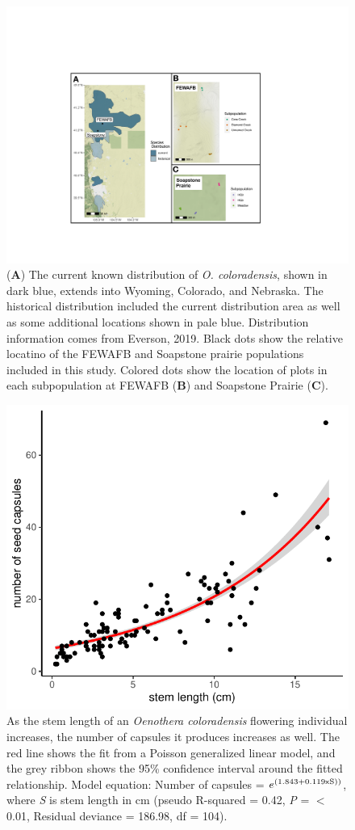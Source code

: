 \documentclass[12pt, letterpaper]{article}
\begin{document}
\begin{figure}[h!]
    \centering
    \includegraphics[width = 1\textwidth]{figures/COBP_mapFigure.pdf}
    \caption{\internallinenumbers(\textbf{A}) The current known distribution of \textit{O. coloradensis}, shown in dark blue, extends into Wyoming, Colorado, and Nebraska. The historical distribution included the current distribution area as well as some additional locations shown in pale blue. Distribution information comes from Everson, 2019. Black dots show the relative locatino of the FEWAFB and Soapstone prairie populations included in this study. Colored dots show the location of plots in each subpopulation at FEWAFB (\textbf{B}) and Soapstone Prairie (\textbf{C}).}
    \label{fig:plotMap}
\end{figure}

\begin{figure}[ht!]
  \centering
  \includegraphics[width=.7\textwidth]{seedRegressionPlot.pdf}
  \caption{ \internallinenumbers As the stem length of an \textit{Oenothera coloradensis} flowering individual increases, the number of capsules it produces increases as well. The red line shows the fit from a Poisson generalized linear model, and the grey ribbon shows the 95\% confidence interval around the fitted relationship. Model equation: Number of capsules = $e^{(1.843 + 0.119\text{\textsf{x}}\text{S}))}$, where \textit{S} is stem length in cm (pseudo R-squared = 0.42, \textit{P} = $<$ 0.01, Residual deviance = 186.98, df = 104).  }
  \label{fig:seedRegression}
\end{figure} 
\end{document}
